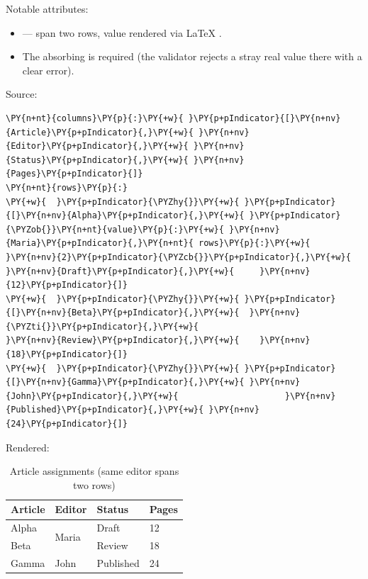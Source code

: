 \documentclass[a4paper,twoside]{article}
\begin{document}
Notable attributes:
\begin{itemize}
\item {} --- span two rows, value rendered via \LaTeX{}
.
\item The absorbing \tscodeinline{\textasciitilde{}} is required (the validator rejects a stray real value
there with a clear error).
\end{itemize}
Source:
\begin{tscode}[lang=yaml, engine=pygments]
\begin{Verbatim}[commandchars=\\\{\},breaklines, breakanywhere, commandchars=\\\{\}]
\PY{n+nt}{columns}\PY{p}{:}\PY{+w}{ }\PY{p+pIndicator}{[}\PY{n+nv}{Article}\PY{p+pIndicator}{,}\PY{+w}{ }\PY{n+nv}{Editor}\PY{p+pIndicator}{,}\PY{+w}{ }\PY{n+nv}{Status}\PY{p+pIndicator}{,}\PY{+w}{ }\PY{n+nv}{Pages}\PY{p+pIndicator}{]}
\PY{n+nt}{rows}\PY{p}{:}
\PY{+w}{  }\PY{p+pIndicator}{\PYZhy{}}\PY{+w}{ }\PY{p+pIndicator}{[}\PY{n+nv}{Alpha}\PY{p+pIndicator}{,}\PY{+w}{ }\PY{p+pIndicator}{\PYZob{}}\PY{n+nt}{value}\PY{p}{:}\PY{+w}{ }\PY{n+nv}{Maria}\PY{p+pIndicator}{,}\PY{n+nt}{ rows}\PY{p}{:}\PY{+w}{ }\PY{n+nv}{2}\PY{p+pIndicator}{\PYZcb{}}\PY{p+pIndicator}{,}\PY{+w}{ }\PY{n+nv}{Draft}\PY{p+pIndicator}{,}\PY{+w}{     }\PY{n+nv}{12}\PY{p+pIndicator}{]}
\PY{+w}{  }\PY{p+pIndicator}{\PYZhy{}}\PY{+w}{ }\PY{p+pIndicator}{[}\PY{n+nv}{Beta}\PY{p+pIndicator}{,}\PY{+w}{  }\PY{n+nv}{\PYZti{}}\PY{p+pIndicator}{,}\PY{+w}{                        }\PY{n+nv}{Review}\PY{p+pIndicator}{,}\PY{+w}{    }\PY{n+nv}{18}\PY{p+pIndicator}{]}
\PY{+w}{  }\PY{p+pIndicator}{\PYZhy{}}\PY{+w}{ }\PY{p+pIndicator}{[}\PY{n+nv}{Gamma}\PY{p+pIndicator}{,}\PY{+w}{ }\PY{n+nv}{John}\PY{p+pIndicator}{,}\PY{+w}{                     }\PY{n+nv}{Published}\PY{p+pIndicator}{,}\PY{+w}{ }\PY{n+nv}{24}\PY{p+pIndicator}{]}
\end{Verbatim}
\end{tscode}
Rendered:
\begin{table}[H]
\centering
\caption{Article assignments (same editor spans two rows)}
\vspace{0.5em}
\begin{tabular}{llll}
\toprule
Article & Editor & Status & Pages \\
\midrule
Alpha & \multirow{2}{*}{Maria} & Draft & 12 \\
Beta &  & Review & 18 \\
Gamma & John & Published & 24 \\
\bottomrule
\end{tabular}
\end{table}
\end{document}
